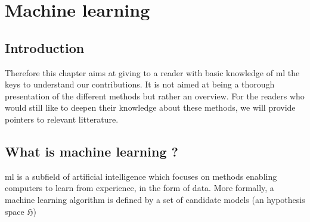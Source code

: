 \chapter{Machine learning}
\label{chap:backml}

\section{Introduction}
\label{sec:backml:intro}

 Therefore this chapter aims at giving to a reader with basic knowledge of \acrshort{ml} the keys to understand our contributions. It is not aimed at being a thorough presentation of the different methods but rather an overview. For the readers who would still like to deepen their knowledge about these methods, we will provide pointers to relevant litterature.  

\section{What is machine learning ?} 
\label{sec:backml:whatisml}

\acrlong{ml} is a subfield of artificial intelligence which focuses on methods enabling computers to learn from experience, in the form of data. More formally, a machine learning algorithm is defined by a set of candidate models (\ie an hypothesis space $\mathfrak{H}$) 


\section{}